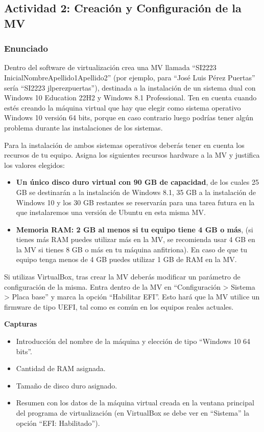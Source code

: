 \subsection{Actividad 2: Creación y Configuración de la MV}

\subsubsection{Enunciado}
Dentro del software de virtualización crea una MV llamada ``SI2223 InicialNombreApellido1Apellido2'' (por ejemplo, para ``José Luis Pérez Puertas'' sería ``SI2223 jlperezpuertas''), destinada a la instalación de un sistema dual con Windows 10 Education 22H2 y Windows 8.1 Professional. Ten en cuenta cuando estés creando la máquina virtual que hay que elegir como sistema operativo Windows 10 versión 64 bits, porque en caso contrario luego podrías tener algún problema durante las instalaciones de los sistemas.

Para la instalación de ambos sistemas operativos deberás tener en cuenta los recursos de tu equipo. Asigna los siguientes recursos hardware a la MV y justifica los valores elegidos:

\begin{itemize}
    \item \textbf{Un único disco duro virtual con 90 GB de capacidad}, de los cuales 25 GB se destinarán a la instalación de Windows 8.1, 35 GB a la instalación de Windows 10 y los 30 GB restantes se reservarán para una tarea futura en la que instalaremos una versión de Ubuntu en esta misma MV.

    \item \textbf{Memoria RAM: 2 GB al menos si tu equipo tiene 4 GB o más}, (si tienes más RAM puedes utilizar más en la MV, se recomienda usar 4 GB en la MV si tienes 8 GB o más en tu máquina anfitriona). En caso de que tu equipo tenga menos de 4 GB puedes utilizar 1 GB de RAM en la MV.
\end{itemize}


Si utilizas VirtualBox, tras crear la MV deberás modificar un parámetro de configuración de la misma. Entra dentro de la MV en ``Configuración > Sistema > Placa base'' y marca la opción ``Habilitar EFI''. Esto hará que la MV utilice un firmware de tipo UEFI, tal como es común en los equipos reales actuales.

\textbf{Capturas}

\begin{itemize}
    \item Introducción del nombre de la máquina y elección de tipo ``Windows 10 64 bits''.
    \item Cantidad de RAM asignada.
    \item Tamaño de disco duro asignado.
    \item Resumen con los datos de la máquina virtual creada en la ventana principal del programa de virtualización (en VirtualBox se debe ver en ``Sistema'' la opción ``EFI: Habilitado'').
\end{itemize}

